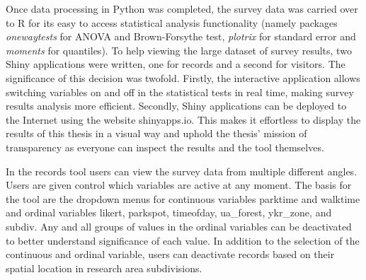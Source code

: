 \justify
Once data processing in Python was completed, the survey data was carried over to R for its easy to access statistical analysis functionality (namely packages \textit{onewaytests} for ANOVA and Brown-Forsythe test, \textit{plotrix} for standard error and \textit{moments} for quantiles). To help viewing the large dataset of survey results, two Shiny applications were written, one for records and a second for visitors. The significance of this decision was twofold. Firstly, the interactive application allows switching variables on and off in the statistical tests in real time, making survey results analysis more efficient. Secondly, Shiny applications can be deployed to the Internet using the website shinyapps.io. This makes it effortless to display the results of this thesis in a visual way and uphold the thesis' mission of transparency as everyone can inspect the results and the tool themselves.

In the records tool users can view the survey data from multiple different angles. Users are given control which variables are active at any moment. The basis for the tool are the dropdown menus for continuous variables parktime and walktime and ordinal variables likert, parkspot, timeofday, ua\_forest, ykr\_zone, and subdiv. Any and all groups of values in the ordinal variables can be deactivated to better understand significance of each value. In addition to the selection of the continuous and ordinal variable, users can deactivate records based on their spatial location in research area subdivisions.

